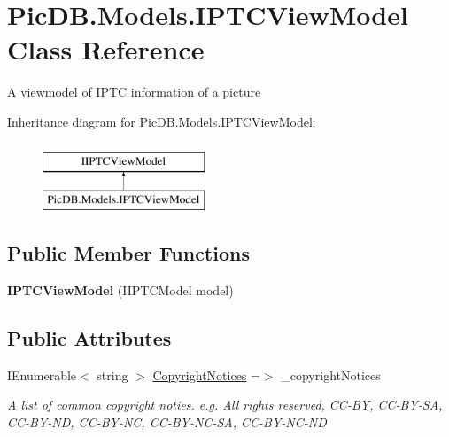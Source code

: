 \hypertarget{class_pic_d_b_1_1_models_1_1_i_p_t_c_view_model}{}\section{Pic\+D\+B.\+Models.\+I\+P\+T\+C\+View\+Model Class Reference}
\label{class_pic_d_b_1_1_models_1_1_i_p_t_c_view_model}


A viewmodel of I\+P\+TC information of a picture  


Inheritance diagram for Pic\+D\+B.\+Models.\+I\+P\+T\+C\+View\+Model\+:\begin{figure}[H]
\begin{center}
\leavevmode
\includegraphics[height=2.000000cm]{class_pic_d_b_1_1_models_1_1_i_p_t_c_view_model}
\end{center}
\end{figure}
\subsection*{Public Member Functions}
\begin{DoxyCompactItemize}
\item 
\mbox{\label{class_pic_d_b_1_1_models_1_1_i_p_t_c_view_model_aebfaf62d0700f3c10ff0f13b2cd1c81f}} 
{\bfseries I\+P\+T\+C\+View\+Model} (I\+I\+P\+T\+C\+Model model)
\end{DoxyCompactItemize}
\subsection*{Public Attributes}
\begin{DoxyCompactItemize}
\item 
I\+Enumerable$<$ string $>$ \mbox{\hyperlink{class_pic_d_b_1_1_models_1_1_i_p_t_c_view_model_a34d44ec95ef04202d7010ad88b5dd473}{Copyright\+Notices}} =$>$ \+\_\+copyright\+Notices
\begin{DoxyCompactList}\small\item\em A list of common copyright noties. e.\+g. All rights reserved, C\+C-\/\+BY, C\+C-\/\+B\+Y-\/\+SA, C\+C-\/\+B\+Y-\/\+ND, C\+C-\/\+B\+Y-\/\+NC, C\+C-\/\+B\+Y-\/\+N\+C-\/\+SA, C\+C-\/\+B\+Y-\/\+N\+C-\/\+ND \end{DoxyCompactList}\end{DoxyCompactItemize}
